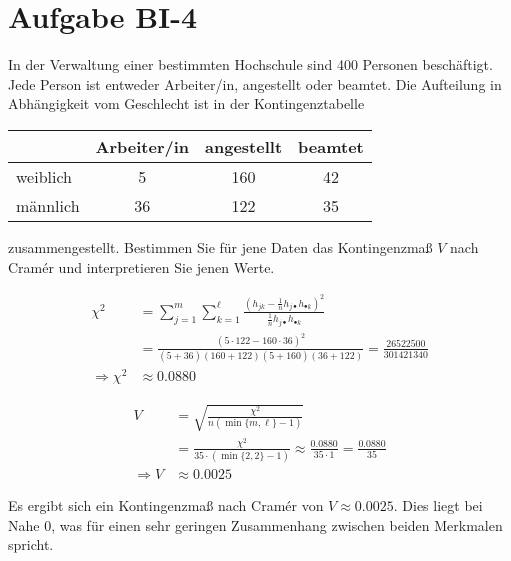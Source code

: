 
\section{Aufgabe BI-4}

\begin{task}
    In der Verwaltung einer bestimmten Hochschule sind 400 Personen beschäftigt. Jede Person ist entweder Arbeiter/in, angestellt oder beamtet. Die Aufteilung in Abhängigkeit vom Geschlecht ist in der Kontingenztabelle

    \begin{table}[H]
    \centering
    \begin{tabular}{l|c|c|c}
                 & Arbeiter/in & angestellt & beamtet \\ \hline
        weiblich & 5           & 160        & 42      \\
        männlich & 36          & 122        & 35     
    \end{tabular}
    \end{table}

    zusammengestellt. Bestimmen Sie für jene Daten das Kontingenzmaß $V$ nach Cramér und interpretieren Sie jenen Werte.
\end{task}

$$
\begin{aligned}
    \chi^2 &= \sum_{j=1}^m \sum_{k=1}^\ell \frac{(h_{jk} - \frac1n h_{j\bullet} h_{\bullet k})^2}{\frac1n h_{j\bullet} h_{\bullet k}} \\
    &= \frac{(5\cdot 122 - 160 \cdot 36)^2}{(5+36)(160+122)(5+160)(36+122)}
    = \frac{26522500}{301421340} \\
    \Rightarrow \chi^2 &\approx 0.0880
\end{aligned}
$$

$$
\begin{aligned}
    V &= \sqrt{\frac{\chi^2}{n (\min\lbrace m,\ell \rbrace - 1)}} \\
    &= \frac{\chi^2}{35 \cdot (\min\lbrace2,2\rbrace - 1)}
    \approx \frac{0.0880}{35 \cdot 1} = \frac{0.0880}{35} \\
    \Rightarrow V &\approx 0.0025
\end{aligned}
$$

Es ergibt sich ein Kontingenzmaß nach Cramér von $V\approx0.0025$. Dies liegt bei Nahe 0, was für einen sehr geringen Zusammenhang zwischen beiden Merkmalen spricht.
